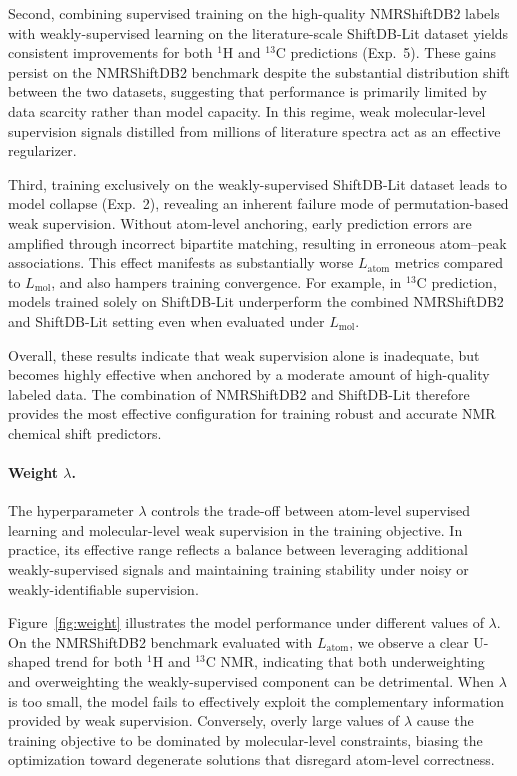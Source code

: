Second, combining supervised training on the high-quality NMRShiftDB2 labels with weakly-supervised learning on the literature-scale ShiftDB-Lit dataset yields consistent improvements for both \(^{1}\)H and \(^{13}\)C predictions (Exp.~5). These gains persist on the NMRShiftDB2 benchmark despite the substantial distribution shift between the two datasets, suggesting that performance is primarily limited by data scarcity rather than model capacity. In this regime, weak molecular-level supervision signals distilled from millions of literature spectra act as an effective regularizer.

Third, training exclusively on the weakly-supervised ShiftDB-Lit dataset leads to model collapse (Exp.~2), revealing an inherent failure mode of permutation-based weak supervision. Without atom-level anchoring, early prediction errors are amplified through incorrect bipartite matching, resulting in erroneous atom–peak associations. This effect manifests as substantially worse $L_{\text{atom}}$ metrics compared to $L_{\text{mol}}$, and also hampers training convergence. For example, in \(^{13}\)C prediction, models trained solely on ShiftDB-Lit underperform the combined NMRShiftDB2 and ShiftDB-Lit setting even when evaluated under $L_{\text{mol}}$.

Overall, these results indicate that weak supervision alone is inadequate, but becomes highly effective when anchored by a moderate amount of high-quality labeled data. The combination of NMRShiftDB2 and ShiftDB-Lit therefore provides the most effective configuration for training robust and accurate NMR chemical shift predictors.


\paragraph{Weight $\lambda$.}

The hyperparameter \( \lambda \) controls the trade-off between atom-level supervised learning and molecular-level weak supervision in the training objective. In practice, its effective range reflects a balance between leveraging additional weakly-supervised signals and maintaining training stability under noisy or weakly-identifiable supervision.

Figure~\ref{fig:weight} illustrates the model performance under different values of \( \lambda \). On the NMRShiftDB2 benchmark evaluated with \( L_{\text{atom}} \), we observe a clear U-shaped trend for both $^1$H and $^{13}$C NMR, indicating that both underweighting and overweighting the weakly-supervised component can be detrimental. When \( \lambda \) is too small, the model fails to effectively exploit the complementary information provided by weak supervision. Conversely, overly large values of \( \lambda \) cause the training objective to be dominated by molecular-level constraints, biasing the optimization toward degenerate solutions that disregard atom-level correctness.


